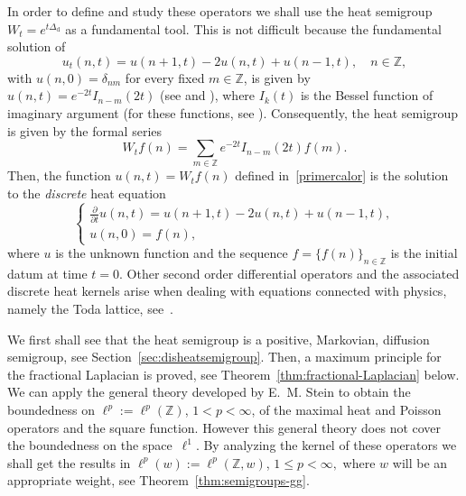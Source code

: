 \documentclass[11pt]{amsart}
\numberwithin{equation}{section}
\newcommand{\Z}{\mathbb{Z}}
\newcommand{\dis}{\mathrm{d}}
\theoremstyle{plain}
\theoremstyle{remark}
\begin{document}
In order to define and study these operators we shall use the heat semigroup $W_t=e^{t\Delta_{\dis}}$ as a fundamental tool. This is not difficult because the fundamental solution of
\[
u_t(n,t)= u(n+1,t)-2u(n,t)+u(n-1,t), \quad n\in\mathbb{Z},
\]
with $u(n,0) =\delta_{nm}$ for every fixed $m \in\mathbb{Z}$,
is given by $u(n,t) = e^{-2t}I_{n-m}(2t)$ (see \cite{Gr} and \cite{GrIl}), where $I_k(t)$ is the Bessel function of imaginary argument (for these functions, see \cite[Chapter~5]{Lebedev}). Consequently, the heat semigroup is given by the formal series
\begin{equation}\label{primercalor}
  W_tf(n) = \sum_{m\in\Z} e^{-2t}I_{n-m}(2t)f(m).
\end{equation}
Then, the function $u(n,t) = W_tf(n)$ defined in~\eqref{primercalor} is the solution to the \textit{discrete} heat equation
\begin{equation}
\label{eq:calorZ}
\begin{cases}
\frac{\partial}{\partial t} u(n,t) =  u(n+1,t) - 2u(n,t) + u(n-1,t), \\[4pt]
u(n,0) = f(n),
\end{cases}
\end{equation}
where $u$ is the unknown function and the sequence $f= \{f(n)\}_{n \in \Z}$ is the initial datum at time $t=0$.
Other second order differential operators and the associated discrete heat kernels arise when dealing with equations connected with physics, namely the Toda lattice, see~\cite{GrIl,Haine,Iliev}.

We first shall see that the heat semigroup is a positive, Markovian, diffusion semigroup, see Section~\ref{sec:disheatsemigroup}. Then, a maximum principle for the fractional Laplacian is proved, see Theorem~\ref{thm:fractional-Laplacian} below. We can apply the general theory developed by E.~M. Stein \cite{St-rojo} to obtain the boundedness on $\ell^p:=\ell^p(\Z)$, $1 < p< \infty$, of the maximal heat and Poisson operators and the square function. However this general theory does not cover the boundedness on the space~$\ell^1$. By analyzing the kernel of these operators we shall get the results in $\ell^p(w):=\ell^p(\Z, w)$, $1\le p < \infty,$ where $w$ will be an appropriate weight, see Theorem~\ref{thm:semigroups-gg}.
\end{document}

